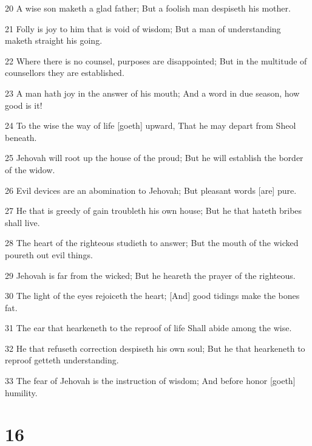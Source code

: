 \par 20 A wise son maketh a glad father; But a foolish man despiseth his mother.
\par 21 Folly is joy to him that is void of wisdom; But a man of understanding maketh straight his going.
\par 22 Where there is no counsel, purposes are disappointed; But in the multitude of counsellors they are established.
\par 23 A man hath joy in the answer of his mouth; And a word in due season, how good is it!
\par 24 To the wise the way of life [goeth] upward, That he may depart from Sheol beneath.
\par 25 Jehovah will root up the house of the proud; But he will establish the border of the widow.
\par 26 Evil devices are an abomination to Jehovah; But pleasant words [are] pure.
\par 27 He that is greedy of gain troubleth his own house; But he that hateth bribes shall live.
\par 28 The heart of the righteous studieth to answer; But the mouth of the wicked poureth out evil things.
\par 29 Jehovah is far from the wicked; But he heareth the prayer of the righteous.
\par 30 The light of the eyes rejoiceth the heart; [And] good tidings make the bones fat.
\par 31 The ear that hearkeneth to the reproof of life Shall abide among the wise.
\par 32 He that refuseth correction despiseth his own soul; But he that hearkeneth to reproof getteth understanding.
\par 33 The fear of Jehovah is the instruction of wisdom; And before honor [goeth] humility.

\chapter{16}

